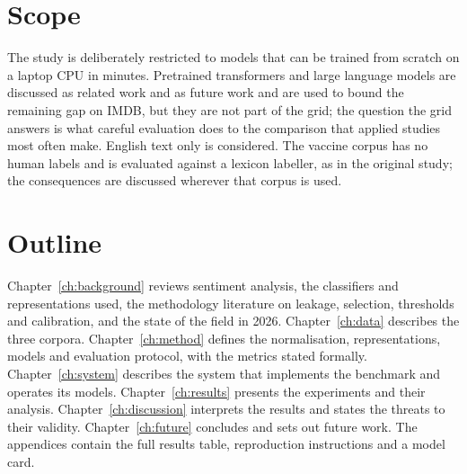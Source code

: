 \section{Scope}
The study is deliberately restricted to models that can be trained from scratch on a laptop CPU in minutes. Pretrained transformers and large language models are discussed as related work and as future work and are used to bound the remaining gap on IMDB, but they are not part of the grid; the question the grid answers is what careful evaluation does to the comparison that applied studies most often make. English text only is considered. The vaccine corpus has no human labels and is evaluated against a lexicon labeller, as in the original study; the consequences are discussed wherever that corpus is used.

\section{Outline}
Chapter~\ref{ch:background} reviews sentiment analysis, the classifiers and representations used, the methodology literature on leakage, selection, thresholds and calibration, and the state of the field in 2026. Chapter~\ref{ch:data} describes the three corpora. Chapter~\ref{ch:method} defines the normalisation, representations, models and evaluation protocol, with the metrics stated formally. Chapter~\ref{ch:system} describes the system that implements the benchmark and operates its models. Chapter~\ref{ch:results} presents the experiments and their analysis. Chapter~\ref{ch:discussion} interprets the results and states the threats to their validity. Chapter~\ref{ch:future} concludes and sets out future work. The appendices contain the full results table, reproduction instructions and a model card.
